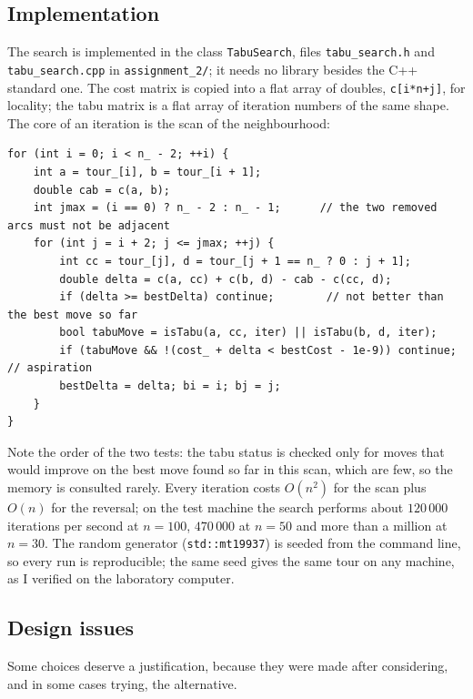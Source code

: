 \documentclass[11pt,a4paper]{article}
\begin{document}
\subsection{Implementation}\label{sec:impl2}
The search is implemented in the class \texttt{TabuSearch}, files \texttt{tabu\_search.h} and
\texttt{tabu\_search.cpp} in \texttt{assignment\_2/}; it needs no library besides the C++ standard
one. The cost matrix is
copied into a flat array of doubles, \texttt{c[i*n+j]}, for locality; the tabu matrix is a
flat array of iteration numbers of the same shape. The core of an iteration is the scan of the
neighbourhood:
\begin{lstlisting}
for (int i = 0; i < n_ - 2; ++i) {
    int a = tour_[i], b = tour_[i + 1];
    double cab = c(a, b);
    int jmax = (i == 0) ? n_ - 2 : n_ - 1;      // the two removed arcs must not be adjacent
    for (int j = i + 2; j <= jmax; ++j) {
        int cc = tour_[j], d = tour_[j + 1 == n_ ? 0 : j + 1];
        double delta = c(a, cc) + c(b, d) - cab - c(cc, d);
        if (delta >= bestDelta) continue;        // not better than the best move so far
        bool tabuMove = isTabu(a, cc, iter) || isTabu(b, d, iter);
        if (tabuMove && !(cost_ + delta < bestCost - 1e-9)) continue;   // aspiration
        bestDelta = delta; bi = i; bj = j;
    }
}
\end{lstlisting}
Note the order of the two tests: the tabu status is checked only for moves that would improve
on the best move found so far in this scan, which are few, so the memory is consulted rarely.
Every iteration costs $O(n^2)$ for the scan plus $O(n)$ for the reversal; on the test machine
the search performs about $120\,000$ iterations per second at $n=100$, $470\,000$ at $n=50$ and
more than a million at $n=30$. The random generator (\texttt{std::mt19937}) is seeded from the
command line, so every run is reproducible; the same seed gives the same tour on any machine,
as I verified on the laboratory computer.

\subsection{Design issues}\label{sec:issues}
Some choices deserve a justification, because they were made after considering, and in some
cases trying, the alternative.
\end{document}
